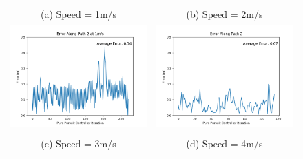 \documentclass{article}
\begin{document}
\begin{figure}[h]
\begin{center}
\begin{tabular}{c|c}
    (a) Speed = 1m/s & (b) Speed = 2m/s \\
    \includegraphics[scale=.5]{path2_speed1_error.png} & \includegraphics[scale=.5]{path2_error.png} \\
    \hline \\
    (c) Speed = 3m/s & (d) Speed = 4m/s \\

\end{tabular}
\end{center}
\end{figure}
\end{document}
